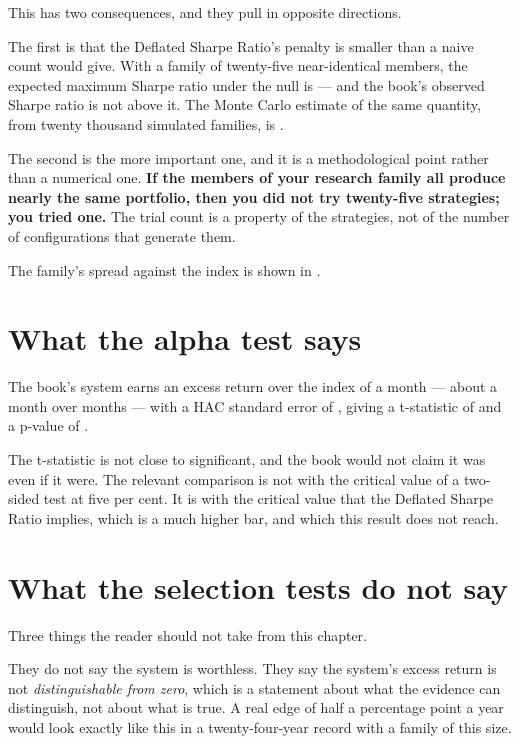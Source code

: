 This has two consequences, and they pull in opposite directions.

The first is that the Deflated Sharpe Ratio's penalty is smaller than a
naive count would give. With a family of twenty-five near-identical
members, the expected maximum Sharpe ratio under the null is
\numSRZero{} --- and the book's observed Sharpe ratio is not above it. The
Monte Carlo estimate of the same quantity, from twenty thousand simulated
families, is \numSRZeroMonteCarlo{}.

The second is the more important one, and it is a methodological point
rather than a numerical one. \textbf{If the members of your research
family all produce nearly the same portfolio, then you did not try
twenty-five strategies; you tried one.} The trial count is a property of
the strategies, not of the number of configurations that generate them.

The family's spread against the index is shown in .

\section{What the alpha test says}

The book's system earns an excess return over the index of \numAlpha{} a
month --- about \numAlpha{} a month over \numAlphaMonths{} months --- with a
HAC standard error of \numAlphaSE{}, giving a t-statistic of
\numAlphaT{} and a p-value of \numAlphaP{}.

The t-statistic is not close to significant, and the book would not claim
it was even if it were. The relevant comparison is not with the critical
value of a two-sided test at five per cent. It is with the critical value
that the Deflated Sharpe Ratio implies, which is a much higher bar, and
which this result does not reach.

\section{What the selection tests do not say}

Three things the reader should not take from this chapter.

They do not say the system is worthless. They say the system's excess
return is not \emph{distinguishable from zero}, which is a statement about
what the evidence can distinguish, not about what is true. A real edge of
half a percentage point a year would look exactly like this in a
twenty-four-year record with a family of this size.

